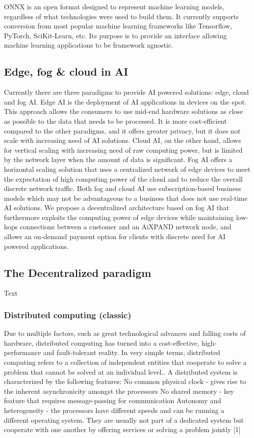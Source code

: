 \documentclass{article}
\begin{document}
ONNX is an open format designed to represent machine learning models, regardless of what technologies were used to build them. It currently supports conversion from most popular machine learning frameworks like Tensorflow, PyTorch, SciKit-Learn, etc. Its purpose is to provide an interface allowing machine learning applications to be framework agnostic.

\subsection{Edge, fog \& cloud in AI }
Currently there are three paradigms to provide AI powered solutions: edge, cloud and fog AI. Edge AI is the deployment of AI applications in devices on the spot. This approach allows the consumers to use mid-end hardware solutions as close as possible to the data that needs to be processed. It is more cost-efficient compared to the other paradigms, and it offers greater privacy, but it does not scale with increasing need of AI solutions. Cloud AI, on the other hand, allows for vertical scaling with increasing need of raw computing power, but is limited by the network layer when the amount of data is significant. Fog AI offers a horizontal scaling solution that uses a centralized network of edge devices to meet the expectation of high computing power of the cloud and to reduce the overall discrete network traffic. Both fog and cloud AI use subscription-based business models which may not be advantageous to a business that does not use real-time AI solutions. We propose a decentralized architecture based on fog AI that furthermore exploits the computing power of edge devices while maintaining low-hops connections between a customer and an AiXPAND network node, and allows an on-demand payment option for clients with discrete need for AI powered applications. 

\subsection{The Decentralized paradigm}
Text
\subsubsection{Distributed computing (classic)}
Due to multiple factors, such as great technological advances and falling costs of hardware, distributed computing has turned into a cost-effective, high-performance and fault-tolerant reality. In very simple terms, distributed computing refers to a collection of independent entities that cooperate to solve a problem that cannot be solved at an individual level.. 
A distributed system is characterized by the following features:
No common physical clock - gives rise to the inherent asynchronicity amongst the processors
No shared memory - key feature that requires message-passing for communication
Autonomy and heterogeneity - the processors have different speeds and can be running a different operating system. They are usually not part of a dedicated system but cooperate with one another by offering services or solving a problem jointly [1]
\end{document}
